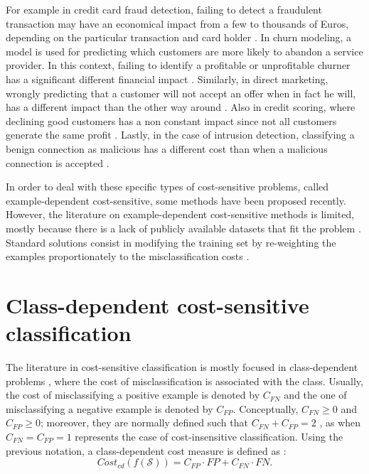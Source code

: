   For example in credit card fraud detection, failing to detect a fraudulent transaction may have 
  an economical impact from a few to thousands of Euros, depending on the particular transaction 
  and card holder \citep{Sahin2013}. In churn modeling, a model is used for predicting which
  customers are more likely to abandon a service provider. In this context, failing to identify a 
  profitable or unprofitable churner has a significant different financial impact 
  \citep{Glady2009}. Similarly, in direct marketing, wrongly predicting that a customer will not 
  accept an offer when in fact he will, has a different impact than the other way around 
  \citep{Zadrozny2003}. Also in credit scoring, where declining good customers has a non constant 
  impact since not all  customers generate the same profit \citep{Verbraken2014}. Lastly, in the 
  case of intrusion   detection, classifying a benign connection as malicious has a different cost 
  than when a   malicious connection is accepted \citep{Ma2011}.
  
  In order to deal with these specific types of cost-sensitive problems, called example-dependent
  cost-sensitive, some methods have been proposed recently. However, the literature on 
  example-dependent cost-sensitive methods is limited, mostly because there is a lack of publicly 
  available datasets that fit the problem \citep{MacAodha2013}. Standard solutions consist in 
  modifying the training set by re-weighting the examples proportionately to the misclassification 
  costs \citep{Elkan2001,Zadrozny2003}.

  
\section{Class-dependent cost-sensitive classification}
\label{sec:3:class-dependent}

The literature in cost-sensitive classification is mostly focused in class-dependent problems 
\citep{Elkan2001}, where 
the cost of misclassification is associated with the class. Usually, the cost of misclassifying a 
positive example is denoted by $C_{FN}$ and the one of misclassifying a negative example is denoted 
by $C_{FP}$. Conceptually, $C_{FN}\ge0$ and $C_{FP}\ge0$; moreover, they are normally defined such
that $C_{FN}+C_{FP}=2$ \citep{Flach2011a}, as when $C_{FN}=C_{FP}=1$ represents the case of 
cost-insensitive classification. Using the previous notation, a class-dependent cost measure is 
defined as \citep{Wang2014}:
\begin{equation}
  Cost_{cd}(f(\mathcal{S})) = C_{FP} \cdot FP + C_{FN} \cdot FN.
\end{equation}

